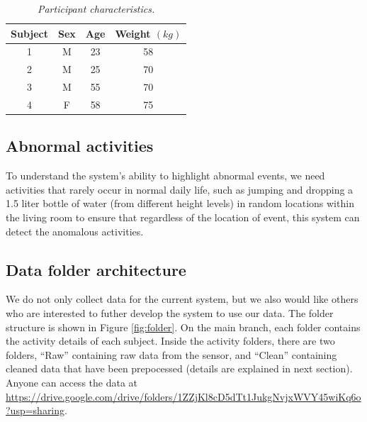 \begin{table}[H]
  \begin{center}
    \caption[Participant characteristics.]{\emph{Participant characteristics.}
      \\ \hspace{\textwidth}}\label{tab:participants}
    \begin{tabular}{c c c c}
      \textbf{Subject} & \textbf{Sex} & \textbf{Age} & \textbf{Weight $(kg)$} \\
      \hline

      1                & M            & 23           & 58                     \\
      \hline

      2                & M            & 25           & 70                     \\
      \hline

      3                & M            & 55           & 70                     \\
      \hline

      4                & F            & 58           & 75                     \\
      \hline
    \end{tabular}
  \end{center}
\end{table}


\subsection{Abnormal activities}

To understand the system's ability to highlight abnormal events, we need activities that rarely occur in normal daily life, such as jumping and dropping a 1.5 liter bottle of water (from different height levels) in random locations within the living room to ensure that regardless of the location of event, this system can detect the anomalous activities.

\subsection{Data folder architecture}

We do not only collect data for the current system, but we also would like others who are interested to futher develop the system to use our data. The folder structure is shown in Figure \ref{fig:folder}. On the main branch, each folder contains the activity details of each subject. Inside the activity folders, there are two folders, ``Raw'' containing raw data from the sensor, and ``Clean'' containing cleaned data that have been prepocessed (details are explained in next section). Anyone can access the data at \url{https://drive.google.com/drive/folders/1ZZjKl8cD5dTt1JukgNvjxWVY45wiKq6o?usp=sharing}.

